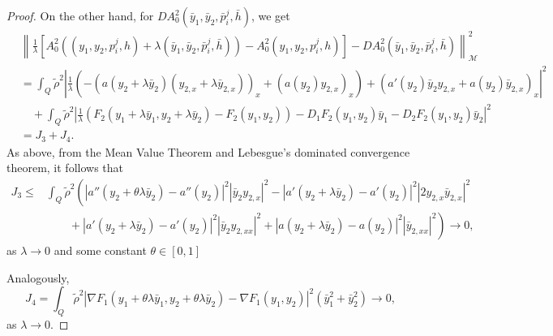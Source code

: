 \documentclass[11pt,a4paper]{amsart}
\numberwithin{equation}{section}
\begin{document}
\begin{proof}
\noindent On the other hand, for $D A^2_0(\bar y_1,\bar y_2,\bar p_i^j,\bar h)$, we get
    \begin{equation*}		
    	\begin{split}
    		&\left\| \frac{1}{\lambda}\left[ A^2_0 (( y_1, y_2, p_i^j, h)+\lambda(\bar y_1,\bar y_2,\bar p_i^j,\bar h)) - A^2_0( y_1, y_2, p_i^j, h) \right] - D A^2_0(\bar y_1,\bar y_2,\bar p_i^j,\bar h) \right\|^{2}_{\mathcal{M}} \\
    		& = \int_Q \tilde\rho^2 \left| \frac{1}{\lambda}\left( - \left( a(y_2 + \lambda \bar y_2) (y_{2,x}+\lambda \bar y_{2,x}) \right)_x + \left( a(y_2)y_{2,x} \right)_x \right) + (a'(y_{2})\bar y_{2} y_{2,x} +a(y_2) \bar y_{2,x})_x \right|^2 \\ 
            &\quad + \int_Q \tilde\rho^2 \left| \frac{1}{\lambda}(F_2(y_1+\lambda\bar y_1,y_2+\lambda\bar y_2)-F_2(y_1,y_2)) - D_1 F_2(y_1,y_2)\bar y_1 - D_2 F_2(y_1,y_2)\bar y_2 \right|^2 \\
            & = J_3+J_4.
    	\end{split}
    \end{equation*}As above, from the Mean Value Theorem and Lebesgue's dominated convergence theorem, it follows that
    \begin{equation*}
        \begin{split}
            J_3 \leq &\int_Q \tilde\rho^2 \left( \left| a''(y_2 + \theta \lambda \bar y_2) - a''(y_2) \right|^2 |\bar y_2 y_{2,x} |^2 - \left| a'(y_2 + \lambda \bar y_2)-a'(y_2) \right|^2 \left| 2 y_{2,x} \bar y_{2,x} \right|^2 \right.\\
            &\left. \qquad + \left| a'(y_2 + \lambda\bar y_2) - a'(y_2) \right|^2 |\bar y_2 y_{2,xx}|^2 + |a(y_2+\lambda\bar y_2)-a(y_2)|^2 |\bar y_{2,xx}|^2 \right) \to 0,
        \end{split}
    \end{equation*} as $\lambda \to 0$ and some  constant $\theta \in [0,1]$ 
    
   \noindent Analogously, %
    $$
        J_4 = \int_Q \tilde\rho^2 \left| \nabla F_1(y_1+\theta\lambda\bar y_1,y_2+\theta\lambda\bar y_2) - \nabla F_1(y_1,y_2) \right|^2 (\bar y_1^2 + \bar y_2^2 ) \to 0,
    $$ as $\lambda \to 0$.
    

\end{proof}
\end{document}
